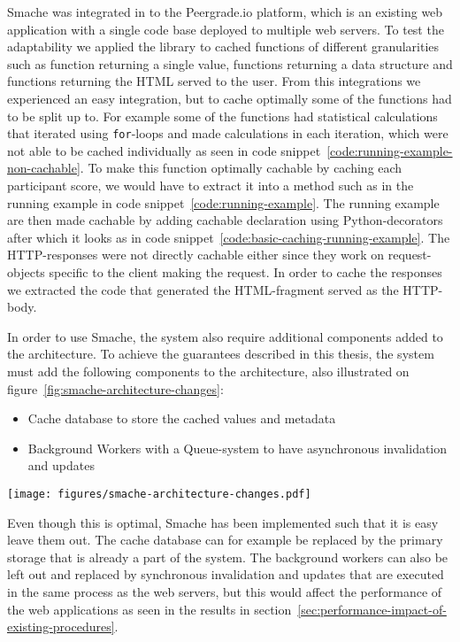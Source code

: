 Smache was integrated in to the Peergrade.io platform, which is an existing web application with a single code base deployed to multiple web servers. To test the adaptability we applied the library to cached functions of different granularities such as function returning a single value, functions returning a data structure and functions returning the HTML served to the user. From this integrations we experienced an easy integration, but to cache optimally some of the functions had to be split up to.
For example some of the functions had statistical calculations that iterated using \verb$for$-loops and made calculations in each iteration, which were not able to be cached individually as seen in code snippet~\ref{code:running-example-non-cachable}. To make this function optimally cachable by caching each participant score, we would have to extract it into a method such as in the running example in code snippet~\ref{code:running-example}. The running example are then made cachable by adding cachable declaration using Python-decorators after which it looks as in code snippet~\ref{code:basic-caching-running-example}.
The HTTP-responses were not directly cachable either since they work on request-objects specific to the client making the request. In order to cache the responses we extracted the code that generated the HTML-fragment served as the HTTP-body.

In order to use Smache, the system also require additional components added to the architecture. To achieve the guarantees described in this thesis, the system must add the following components to the architecture, also illustrated on figure~\ref{fig:smache-architecture-changes}:

\begin{itemize}
  \item Cache database to store the cached values and metadata
  \item Background Workers with a Queue-system to have asynchronous invalidation and updates
\end{itemize}

\begin{figure*}[ht!]
  \centering
  \texttt{[image: figures/smache-architecture-changes.pdf]}
  \caption{Additional architectural components required to use Smache compared to a normal web application including clients, web application servers and a primary storage.}
  \label{fig:smache-architecture-changes}
\end{figure*}

Even though this is optimal, Smache has been implemented such that it is easy leave them out. The cache database can for example be replaced by the primary storage that is already a part of the system. The background workers can also be left out and replaced by synchronous invalidation and updates that are executed in the same process as the web servers, but this would affect the performance of the web applications as seen in the results in section~\ref{sec:performance-impact-of-existing-procedures}.

